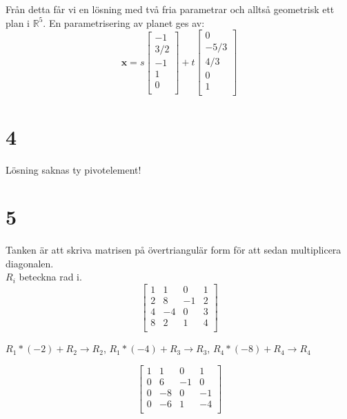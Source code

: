 \documentclass{article}
\begin{document}
\noindent
Från detta får vi en lösning med två fria parametrar och alltså geometrisk ett 
plan i $\mathbb{R}^5$. En parametrisering av planet ges av:
$$
\mathbf{x} = s
\begin{bmatrix}
    -1 \\
    3/2 \\
    -1 \\
    1 \\
    0 \\
\end{bmatrix}
+ t
\begin{bmatrix}
    0 \\
    -5/3 \\ 
    4/3 \\
    0 \\
    1 \\
\end{bmatrix}
$$

\section*{4}
Lösning saknas ty pivotelement!

\section*{5}
Tanken är att skriva matrisen på övertriangulär form för att sedan multiplicera diagonalen.
\\
$R_i$ beteckna rad i.\\

$$
\begin{bmatrix}
    1  & 1   &  0   &  1 \\
    2  & 8   &  -1  &  2  \\
    4  & -4  &  0   &  3   \\
    8  &  2  &  1   &  4   \\
\end{bmatrix}
$$

$R_1 * (-2) + R_2 \rightarrow R_2$, \quad
$R_1 * (-4) + R_3 \rightarrow R_3$, \quad
$R_4 * (-8) + R_4 \rightarrow R_4$   


$$
\begin{bmatrix}
    1  & 1   &  0   &  1 \\
    0  & 6   &  -1  &  0  \\
    0  & -8  &  0   &  -1   \\
    0  &  -6  &  1   &  -4   \\
\end{bmatrix}
$$
\end{document}
